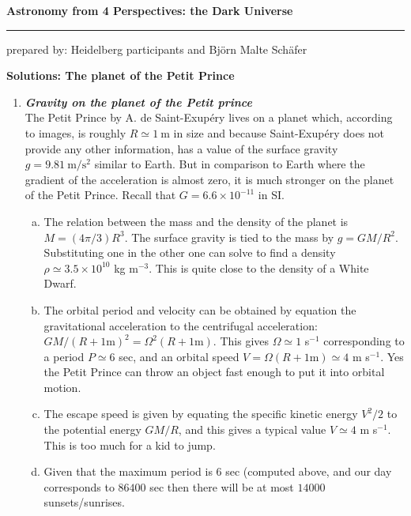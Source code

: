 \documentclass[a4paper,12pt]{article}
\newcommand{\question}[1]{\textbf{\textit{#1}}}
\newcommand{\HRule}{\rule{\linewidth}{0.3mm}}
\begin{document}
\pagestyle{empty}

\begin{center}
\LARGE \textbf{Astronomy from 4 Perspectives: the Dark Universe}
\HRule
\end{center}
\begin{flushright}
prepared by: Heidelberg participants and Bj{\"o}rn Malte Sch{\"a}fer
\end{flushright}
\begin{center}
{\Large \textbf{Solutions: The planet of the Petit Prince}}
\end{center}
\vspace{5mm}

\begin{enumerate}

\item \question{Gravity on the planet of the Petit prince}\\
The Petit Prince by A. de Saint-Exup{\'e}ry lives on a planet which,
according to images, is roughly $R\simeq 1~\mathrm{m}$ in size and
because Saint-Exup{\'e}ry does not provide any other information, has a
value of the surface gravity $g=9.81~\mathrm{m}/\mathrm{s}^2$ similar
to Earth. But in comparison to Earth where the gradient of the
acceleration is almost zero, it is much stronger on the planet of the
Petit Prince. Recall that $G=6.6\times 10^{-11}$ in SI.
\begin{enumerate}[(a)]
\item{The relation between the mass and the density of the planet is
    $M=(4\pi /3)R^3$. The surface gravity is tied to the mass by
    $g=GM/R^2$. Substituting one in the other one can solve to find a
    density $\rho \simeq 3.5\times 10^{10}$ kg m$^{-3}$. This is quite
  close to the density of a White Dwarf.}
\item{The orbital period and velocity can be obtained by equation the
    gravitational acceleration to the centrifugal acceleration:
    $GM/(R+1\mathrm{m})^2 = \Omega^2 (R+1\mathrm{m}) $. This gives
    $\Omega \simeq 1$ s$^{-1}$ corresponding to a period $P\simeq 6$ sec, and
    an orbital speed $V=\Omega (R+1\mathrm{m})\simeq 4$ m
    s$^{-1}$. Yes the Petit Prince can throw an object fast enough to
    put it into orbital motion.}
\item{The escape speed is given by equating the specific kinetic
    energy $V^2/2$ to the potential energy $GM/R$, and this gives a
    typical value $V\simeq 4$ m
    s$^{-1}$. This is too much for a kid to jump.}
\item{Given that the maximum period is 6 sec (computed above, and our
    day corresponds to $86400$ sec then
    there will be at most $14000$ sunsets/sunrises.}
\end{enumerate}


\end{enumerate}
\end{document}
